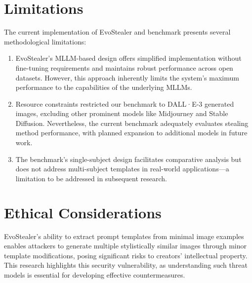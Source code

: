 \section{Limitations}



The current implementation of EvoStealer and benchmark presents several methodological limitations:
\begin{enumerate}
    \item EvoStealer's MLLM-based design offers simplified implementation without fine-tuning requirements and maintains robust performance across open datasets. However, this approach inherently limits the system's maximum performance to the capabilities of the underlying MLLMs.
    \item Resource constraints restricted our benchmark to DALL·E-3 generated images, excluding other prominent models like Midjourney and Stable Diffusion. Nevertheless, the current benchmark adequately evaluates stealing method performance, with planned expansion to additional models in future work.
    \item The benchmark's single-subject design facilitates comparative analysis but does not address multi-subject templates in real-world applications—a limitation to be addressed in subsequent research.
\end{enumerate}

\section{Ethical Considerations}
EvoStealer's ability to extract prompt templates from minimal image examples enables attackers to generate multiple stylistically similar images through minor template modifications, posing significant risks to creators' intellectual property. This research highlights this security vulnerability, as understanding such threat models is essential for developing effective countermeasures.

